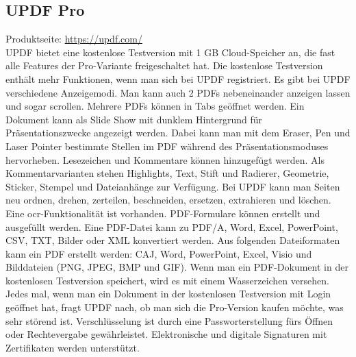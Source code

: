 \subsection{UPDF Pro}
Produktseite: \url{https://updf.com/} \\
UPDF bietet eine kostenlose Testversion mit 1 GB Cloud-Speicher an, die fast alle Features der Pro-Variante freigeschaltet hat. Die kostenlose Testversion enthält mehr Funktionen, wenn man sich bei UPDF registriert. Es gibt bei UPDF verschiedene Anzeigemodi. Man kann auch 2 PDFs nebeneinander anzeigen lassen und sogar scrollen. Mehrere PDFs können in Tabs geöffnet werden. Ein Dokument kann als Slide Show mit dunklem Hintergrund für Präsentationszwecke angezeigt werden. Dabei kann man mit dem Eraser, Pen und Laser Pointer bestimmte Stellen im PDF während des Präsentationsmoduses hervorheben. Lesezeichen und Kommentare können hinzugefügt werden. Als Kommentarvarianten stehen Highlights, Text, Stift und Radierer, Geometrie, Sticker, Stempel und Dateianhänge zur Verfügung. Bei UPDF kann man Seiten neu ordnen, drehen, zerteilen, beschneiden, ersetzen, extrahieren und löschen. Eine \gls{ocr}-Funktionalität ist vorhanden. PDF-Formulare können erstellt und ausgefüllt werden. Eine PDF-Datei kann zu PDF/A, Word, Excel, PowerPoint, CSV, TXT, Bilder oder XML konvertiert werden. Aus folgenden Dateiformaten kann ein PDF erstellt werden: CAJ, Word, PowerPoint, Excel, Visio und Bilddateien (PNG, JPEG, BMP und GIF). Wenn man ein PDF-Dokument in der kostenlosen Testversion speichert, wird es mit einem Wasserzeichen versehen. Jedes mal, wenn man ein Dokument in der kostenlosen Testversion mit Login geöffnet hat, fragt UPDF nach, ob man sich die Pro-Version kaufen möchte, was sehr störend ist. Verschlüsselung ist durch eine Passworterstellung fürs Öffnen oder Rechtevergabe gewährleistet. Elektronische und digitale Signaturen mit Zertifikaten werden unterstützt. 
\par
